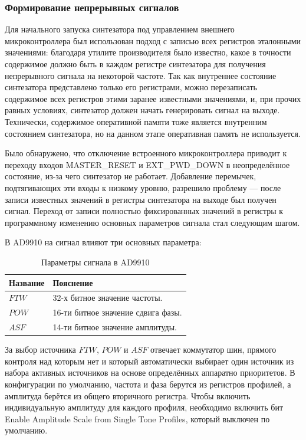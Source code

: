 \documentclass[rusmathsym, eqnumwithinsec, amspack, hyperref]{bomgost}
\begin{document}
\subsubsection{Формирование непрерывных сигналов}

Для начального запуска синтезатора под управлением внешнего микроконтроллера был использован подход с записью всех регистров эталонными значениями: благодаря утилите производителя было известно, какое в точности содержимое должно быть в каждом регистре синтезатора для получения непрерывного сигнала на некоторой частоте. Так как внутреннее состояние синтезатора представлено только его регистрами, можно перезаписать содержимое всех регистров этими заранее известными значениями, и, при прочих равных условиях, синтезатор должен начать генерировать сигнал на выходе. Технически, содержимое оперативной памяти тоже является внутренним состоянием синтезатора, но на данном этапе оперативная память не используется.

Было обнаружено, что отключение встроенного микроконтроллера приводит к переходу входов MASTER\_RESET и EXT\_PWD\_DOWN в неопределённое состояние, из-за чего синтезатор не работает. Добавление перемычек, подтягивающих эти входы к низкому уровню, разрешило проблему --- после записи известных значений в регистры синтезатора на выходе был получен сигнал. Переход от записи полностью фиксированных значений в регистры к программному изменению основных параметров сигнала стал следующим шагом.


В AD9910 на сигнал влияют три основных параметра:

\begin{table}[H]
\centering
\caption{Параметры сигнала в AD9910}
\label{tab:signal_parameters}
\begin{tabular}{|p{4cm}|p{8cm}|}
\hline 
\textbf{Название} & \textbf{Пояснение} \\ 
\hline 
$FTW$ & 32-х битное значение частоты. \\ 
\hline
$POW$ & 16-ти битное значение сдвига фазы. \\
\hline
$ASF$ & 14-ти битное значение амплитуды. \\
\hline
\end{tabular} 
\end{table}

За выбор источника $FTW$, $POW$ и $ASF$ отвечает коммутатор шин, прямого контроля над которым нет и который автоматически выбирает один источник из набора активных источников на основе определённых аппаратно приоритетов. В конфигурации по умолчанию, частота и фаза берутся из регистров профилей, а амплитуда берётся из общего вторичного регистра. Чтобы включить индивидуальную амплитуду для каждого профиля, необходимо включить бит Enable Amplitude Scale from Single Tone Profiles, который выключен по умолчанию.
\end{document}
